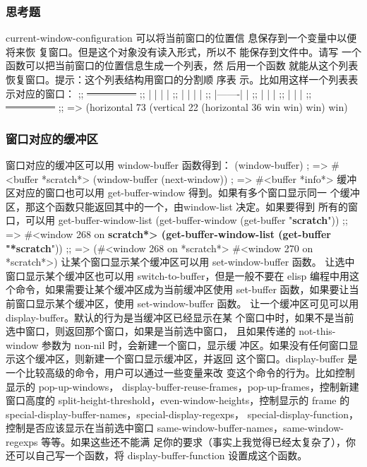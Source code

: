 \documentclass[11pt]{ctexart}
\begin{document}
{{{{\subsubsection{思考题}
\label{sec:orgd285715}
current-window-configuration 可以将当前窗口的位置信 息保存到一个变量中以便将来恢
复窗口。但是这个对象没有读入形式，所以不 能保存到文件中。请写
一个函数可以把当前窗口的位置信息生成一个列表，然 后用一个函数
就能从这个列表恢复窗口。提示：这个列表结构用窗口的分割顺 序表
示。比如用这样一个列表表示对应的窗口：
;; \sout{---------------}
;; |   |   |       |
;; |   |   |       |
;; |-------|       |
;; |       |       |
;; |       |       |
;; \sout{---------------}
;; =>
(horizontal 73
(vertical 22
(horizontal 36 win win)
win)
win)
\subsubsection{窗口对应的缓冲区}
\label{sec:orge472e7b}
窗口对应的缓冲区可以用 window-buffer 函数得到：
(window-buffer)                         ; => \#<buffer *scratch*>
(window-buffer (next-window))           ; => \#<buffer *info*>
缓冲区对应的窗口也可以用 get-buffer-window 得到。如果有多个窗口显示同一 个缓冲区，那这个函数只能返回其中的一个，由window-list 决定。如果要得到 所有的窗口，可以用 get-buffer-window-list
(get-buffer-window (get-buffer "\textbf{scratch}"))
;; => \#<window 268 on \textbf{scratch*>
(get-buffer-window-list (get-buffer "*scratch}"))
;; => (\#<window 268 on *scratch*> \#<window 270 on *scratch*>)
让某个窗口显示某个缓冲区可以用 set-window-buffer 函数。 让选中窗口显示某个缓冲区也可以用 switch-to-buffer，但是一般不要在 elisp 编程中用这个命令，如果需要让某个缓冲区成为当前缓冲区使用 set-buffer 函数，如果要让当前窗口显示某个缓冲区，使用 set-window-buffer 函数。
让一个缓冲区可见可以用 display-buffer。默认的行为是当缓冲区已经显示在某 个窗口中时，如果不是当前选中窗口，则返回那个窗口，如果是当前选中窗口， 且如果传递的 not-this-window 参数为 non-nil 时，会新建一个窗口，显示缓 冲区。如果没有任何窗口显示这个缓冲区，则新建一个窗口显示缓冲区，并返回 这个窗口。display-buffer 是一个比较高级的命令，用户可以通过一些变量来改 变这个命令的行为。比如控制显示的 pop-up-windows， display-buffer-reuse-frames，pop-up-frames，控制新建窗口高度的 split-height-threshold，even-window-heights，控制显示的 frame 的 special-display-buffer-names，special-display-regexps， special-display-function，控制是否应该显示在当前选中窗口 same-window-buffer-names，same-window-regexps 等等。如果这些还不能满 足你的要求（事实上我觉得已经太复杂了），你还可以自己写一个函数，将 display-buffer-function 设置成这个函数。
}}}}
\end{document}
